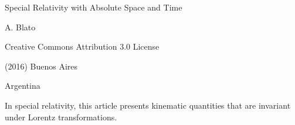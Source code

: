 \documentclass[10pt,fleqn]{article}
\begin{document}
\begin{center}

{\sc Special Relativity with Absolute Space and Time}

\bigskip \medskip

{A. Blato}

\bigskip \medskip

\small

Creative Commons Attribution 3.0 License

\smallskip

(2016) Buenos Aires

\medskip

Argentina

\smallskip

\bigskip \medskip

\parbox{78.60mm}{In special relativity, this article presents kinematic quantities that are invariant under Lorentz transformations.}

\end{center}

\normalsize

\vspace{-1.20em}

\par {}

\bigskip \smallskip
\end{document}
